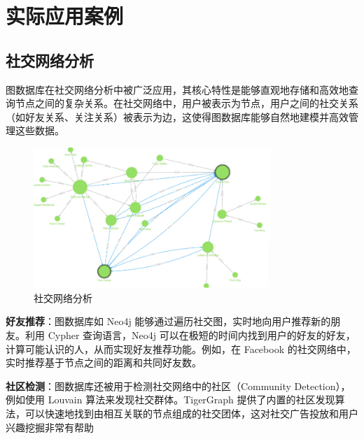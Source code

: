 \section{实际应用案例}

\subsection{社交网络分析}
图数据库在社交网络分析中被广泛应用，其核心特性是能够直观地存储和高效地查询节点之间的复杂关系。在社交网络中，用户被表示为节点，用户之间的社交关系（如好友关系、关注关系）被表示为边，这使得图数据库能够自然地建模并高效管理这些数据。

\begin{figure}
    \centering
    \includegraphics[width=0.8\textwidth]{images/24.png}
    \caption{社交网络分析}
    \label{fig:24}
\end{figure}
\textbf{好友推荐}：图数据库如 Neo4j 能够通过遍历社交图，实时地向用户推荐新的朋友。利用 Cypher 查询语言，Neo4j 可以在极短的时间内找到用户的好友的好友，计算可能认识的人，从而实现好友推荐功能。例如，在 Facebook 的社交网络中，实时推荐基于节点之间的距离和共同好友数\cite{ahmad2020missing,wang2022common}。


\textbf{社区检测}：图数据库还被用于检测社交网络中的社区（Community Detection），例如使用 Louvain 算法来发现社交群体。TigerGraph 提供了内置的社区发现算法，可以快速地找到由相互关联的节点组成的社交团体，这对社交广告投放和用户兴趣挖掘非常有帮助\cite{tsitseklis2020scalable,beis2015benchmarking}


